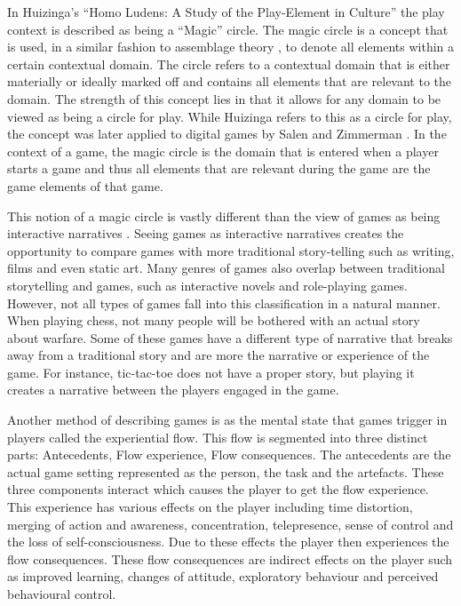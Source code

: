 \documentclass[11pt]{article}
\begin{document}
In Huizinga's ``Homo Ludens: A Study of the Play-Element in Culture'' \cite{Huizinga} the play context is described as being a ``Magic'' circle. The magic circle is a concept that is used, in a similar fashion to assemblage theory \cite{Taylor2009}, to denote all elements within a certain contextual domain. The circle refers to a contextual domain that is either materially or ideally marked off and contains all elements that are relevant to the domain. The strength of this concept lies in that it allows for any domain to be viewed as being a circle for play. While Huizinga refers to this as a circle for play, the concept was later applied to digital games by Salen and Zimmerman \cite{Zimmerman2004}. In the context of a game, the magic circle is the domain that is entered when a player starts a game and thus all elements that are relevant during the game are the game elements of that game.

This notion of a magic circle is vastly different than the view of games as being interactive narratives \cite{Hartsook2011,Marchiori2011,Li2012,Jenkins2004}. Seeing games as interactive narratives creates the opportunity to compare games with more traditional story-telling such as writing, films and even static art. Many genres of games also overlap between traditional storytelling and games, such as interactive novels and role-playing games. However, not all types of games fall into this classification in a natural manner. When playing chess, not many people will be bothered with an actual story about warfare. Some of these games have a different type of narrative that breaks away from a traditional story and are more the narrative or experience of the game. For instance, tic-tac-toe does not have a proper story, but playing it creates a narrative between the players engaged in the game.

Another method of describing games is as the mental state that games trigger in players \cite{Kiili2005} called the experiential flow. This flow is segmented into three distinct parts: Antecedents, Flow experience, Flow consequences. The antecedents are the actual game setting represented as the person, the task and the artefacts. These three components interact which causes the player to get the flow experience. This experience has various effects on the player including time distortion, merging of action and awareness, concentration, telepresence, sense of control and the loss of self-consciousness. Due to these effects the player then experiences the flow consequences. These flow consequences are indirect effects on the player such as improved learning, changes of attitude, exploratory behaviour and perceived behavioural control.
\end{document}
